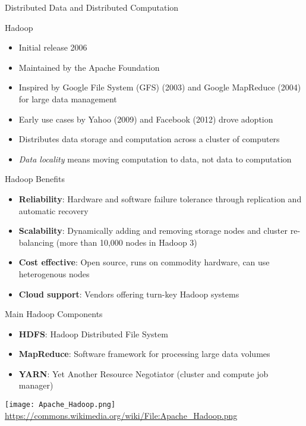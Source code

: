 \documentclass[ignorenonframetext,xcolor=x11names]{beamer}
\begin{document}
\begin{frame}{Distributed Data and Distributed Computation}
\begin{block}{Hadoop}
\begin{itemize}
   \item Initial release 2006
   \item Maintained by the Apache Foundation
   \item Inspired by Google File System (GFS) (2003) and Google MapReduce (2004) for large data management
   \item Early use cases by Yahoo (2009) and Facebook (2012) drove adoption
   \item Distributes data storage and computation across a cluster of computers
   \item \emph{Data locality} means moving computation to data, not data to computation
\end{itemize}
\end{block}
\end{frame}

\begin{frame}{Hadoop Benefits}
\begin{itemize}
  \item \textbf{Reliability}: Hardware and software failure tolerance through replication and automatic recovery
  \item \textbf{Scalability}: Dynamically adding and removing storage nodes and cluster re-balancing (more than 10,000 nodes in Hadoop 3)
  \item \textbf{Cost effective}: Open source, runs on commodity hardware, can use heterogenous nodes
  \item \textbf{Cloud support}: Vendors offering turn-key Hadoop systems
\end{itemize}
\end{frame}

\begin{frame}{Main Hadoop Components}
\begin{itemize}
    \item \textbf{HDFS}: Hadoop Distributed File System
    \item \textbf{MapReduce}: Software framework for processing large data volumes
    \item \textbf{YARN}: Yet Another Resource Negotiator (cluster and compute job manager)
\end{itemize}

\centering
\vspace{2\baselineskip}
\texttt{[image: Apache\_Hadoop.png]}
\scriptsize \url{https://commons.wikimedia.org/wiki/File:Apache_Hadoop.png}
\end{frame}
\end{document}
